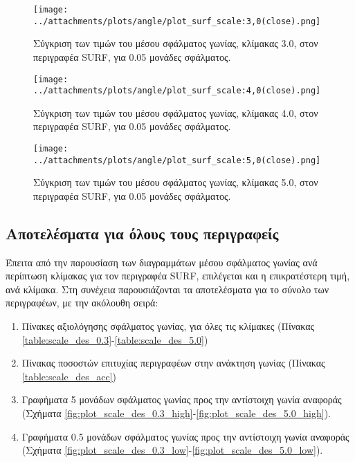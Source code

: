  \newpage
 
 \begin{figure}[ht!]
\begin{minipage}[b]{1.0\linewidth}
\centering
\texttt{[image: ../attachments/plots/angle/plot\_surf\_scale:3,0(close).png]}
\caption{Σύγκριση των τιμών του μέσου σφάλματος γωνίας, κλίμακας 3.0, στον περιγραφέα SURF, για 0.05 μονάδες σφάλματος.}
\label{figure:plot_scale_surf_low_3.0}
\end{minipage}
\end{figure} 
\begin{figure}[ht!]
\begin{minipage}[b]{1.0\linewidth}
\centering
\texttt{[image: ../attachments/plots/angle/plot\_surf\_scale:4,0(close).png]}
\caption{Σύγκριση των τιμών του μέσου σφάλματος γωνίας, κλίμακας 4.0, στον περιγραφέα SURF, για 0.05 μονάδες σφάλματος.}
\label{figure:plot_scale_surf_low_4.0}
\end{minipage}

 \end{figure} 
 
 \newpage
 
 \begin{figure}[ht!]
\begin{minipage}[b]{1.0\linewidth}
\centering
\texttt{[image: ../attachments/plots/angle/plot\_surf\_scale:5,0(close).png]}
\caption{Σύγκριση των τιμών του μέσου σφάλματος γωνίας, κλίμακας 5.0, στον περιγραφέα SURF, για 0.05 μονάδες σφάλματος.}
\label{figure:plot_scale_surf_low_5.0}
\end{minipage}
 
 \end{figure} 
 
 \newpage
 
  \subsection{Αποτελέσματα για όλους τους περιγραφείς}

 Έπειτα από την παρουσίαση των διαγραμμάτων μέσου σφάλματος γωνίας ανά περίπτωση κλίμακας για τον περιγραφέα SURF, 
 επιλέγεται και η επικρατέστερη τιμή, ανά κλίμακα. Στη συνέχεια παρουσιάζονται τα αποτελέσματα 
για το σύνολο των περιγραφέων, με την ακόλουθη σειρά: 

\begin{enumerate}
  
  \item Πίνακες αξιολόγησης σφάλματος γωνίας, για όλες τις κλίμακες (Πίνακας \ref{table:scale_des_0.3}-\ref{table:scale_des_5.0})
  \item Πίνακας ποσοστών επιτυχίας περιγραφέων στην ανάκτηση γωνίας (Πίνακας \ref{table:scale_des_acc}) 
  \item Γραφήματα 5 μονάδων σφάλματος γωνίας προς την αντίστοιχη γωνία αναφοράς (Σχήματα \ref{fig:plot_scale_des_0.3_high}-\ref{fig:plot_scale_des_5.0_high}).
  \item Γραφήματα 0.5 μονάδων σφάλματος γωνίας προς την αντίστοιχη γωνία αναφοράς (Σχήματα \ref{fig:plot_scale_des_0.3_low}-\ref{fig:plot_scale_des_5.0_low}).


\end{enumerate}



